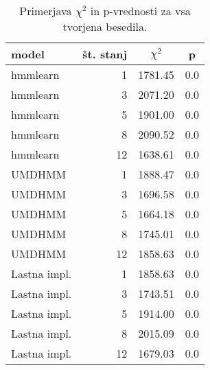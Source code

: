 \begin{table}
\centering
\begin{tabular}{|l|r|c|c|}
\hline
{\bf model}  & {\bf št. stanj} & {\bf $\chi^2$} & \bf{p} \\
\hline
hmmlearn     &  1              & 1781.45        & 0.0 \\
hmmlearn     &  3              & 2071.20        & 0.0 \\
hmmlearn     &  5              & 1901.00        & 0.0 \\
hmmlearn     &  8              & 2090.52        & 0.0 \\
hmmlearn     & 12              & 1638.61        & 0.0 \\
\hline
UMDHMM       &  1              & 1888.47        & 0.0 \\
UMDHMM       &  3              & 1696.58        & 0.0 \\
UMDHMM       &  5              & 1664.18        & 0.0 \\
UMDHMM       &  8              & 1745.01        & 0.0 \\
UMDHMM       & 12              & 1858.63        & 0.0 \\
\hline
Lastna impl. &  1              & 1858.63        & 0.0 \\
Lastna impl. &  3              & 1743.51        & 0.0 \\
Lastna impl. &  5              & 1914.00        & 0.0 \\
Lastna impl. &  8              & 2015.09        & 0.0 \\
Lastna impl. & 12              & 1679.03        & 0.0 \\
\hline
\end{tabular}
\caption{Primerjava $\chi^2$ in p-vrednosti za vsa tvorjena besedila.}
\label{tab:bench_model_comparison}
\end{table}
